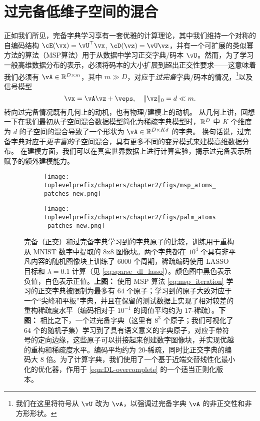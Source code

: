 \documentclass[../../book-main.tex]{subfiles}
\begin{document}
\section{过完备低维子空间的混合}
\label{sec:dictionary_learning}
正如我们所见，完备字典学习享有一套优雅的计算理论，其中我们维持一个对称的自编码结构 $\cE(\vx) = \vU^\top \vx$, $\cD(\vz) = \vU \vz$，并有一个可扩展的类似幂方法的算法（MSP算法）用于从数据中学习正交字典/码本 $\vU$。然而，为了学习一般高维数据分布的表示，必须将码本的大小扩展到超出正交性要求——这意味着我们必须有 $\vA \in \R^{D \times m}$，其中 $m \gg D$，对应于\textit{过完备}字典/码本的情况，\footnote{我们在这里将符号从 $\vU$ 改为 $\vA$，以强调过完备字典 $\vA$ 的非正交性和非方形形状。}以及信号模型
\begin{equation}\label{eq:model-DL-overcomplete}
    \vx =  \vA \vz + \veps,
    \quad
    \norm{\vz}_0 = d \ll m.
\end{equation}
转向过完备情况既有几何上的动机，也有物理/建模上的动机。
从几何上讲，回想一下在我们最初从子空间混合数据模型简化为稀疏字典模型时，$\mathbb{R}^D$ 中 $K$ 个维度为 $d$ 的子空间的混合导致了一个形状为 $\vA \in \R^{D \times Kd}$ 的字典。
换句话说，过完备字典对应于\textit{更丰富的}子空间混合，具有更多不同的变异模式来建模高维数据分布。
在建模方面，我们可以在真实世界数据上进行计算实验，揭示过完备表示所赋予的额外建模能力。

\begin{figure}[t]
\centering
    \begin{subfigure}{0.9\linewidth}
        \centering
        \texttt{[image: \\toplevelprefix/chapters/chapter2/figs/msp\_atoms\_patches\_new.png]}
        \caption{}
    \end{subfigure}
    \begin{subfigure}{0.9\linewidth}
        \centering
        \texttt{[image: \\toplevelprefix/chapters/chapter2/figs/palm\_atoms\_patches\_new.png]}
        \caption{}
    \end{subfigure}
    \caption{完备（正交）和过完备字典学习到的字典原子的比较，训练用于重构从 MNIST 数字中提取的 8x8 图像块。两个字典都在 $10^4$ 个具有非平凡内容的随机图像块上训练了 $6000$ 个周期，稀疏编码使用 LASSO 目标和 $\lambda=0.1$ 计算（见 \eqref{eq:sparse_dl_lasso}）。颜色图中黑色表示负值，白色表示正值。\textbf{上图：} 使用 MSP 算法 \eqref{eq:msp_iteration} 学习的正交字典被限制为最多有 $64$ 个原子；学习到的原子大致对应于一个“尖峰和平板”字典，并且在保留的测试数据上实现了相对较差的重构稀疏度水平（编码相对于 $10^{-1}$ 的阈值平均约为 $17$-稀疏）。\textbf{下图：} 相比之下，一个过完备字典（这里有 $8^3$ 个原子；我们可视化了 $64$ 个的随机子集）学习到了具有语义意义的字典原子，对应于带符号的定向边缘，这些原子可以拼接起来创建数字图像块，并实现优越的重构和稀疏度水平。编码平均约为 $20$-稀疏，同时比正交字典的编码大 $8$ 倍。为了计算字典，我们使用了一个基于近端交替线性化最小化的优化器，作用于 \eqref{eqn:DL-overcomplete} 的一个适当正则化版本。}
    \label{fig:ReconMNIST}
\end{figure}
\end{document}
